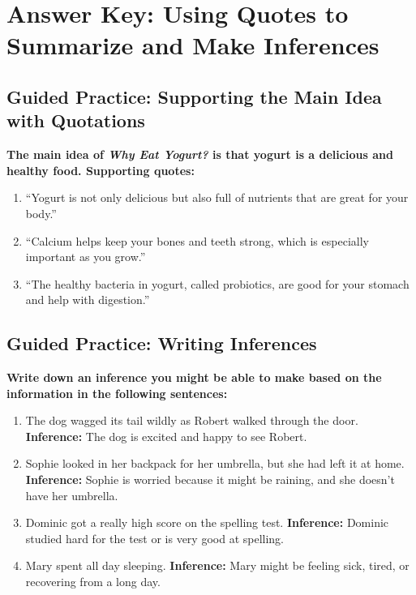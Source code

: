 \documentclass[12pt]{article}
\begin{document}
\section*{Answer Key: Using Quotes to Summarize and Make Inferences}

\subsection*{Guided Practice: Supporting the Main Idea with Quotations}
\textbf{The main idea of \textit{Why Eat Yogurt?} is that yogurt is a delicious and healthy food. Supporting quotes:}
\begin{enumerate}
    \item “Yogurt is not only delicious but also full of nutrients that are great for your body.”
    \item “Calcium helps keep your bones and teeth strong, which is especially important as you grow.”
    \item “The healthy bacteria in yogurt, called probiotics, are good for your stomach and help with digestion.”
\end{enumerate}

\subsection*{Guided Practice: Writing Inferences}
\textbf{Write down an inference you might be able to make based on the information in the following sentences:}
\begin{enumerate}
    \item The dog wagged its tail wildly as Robert walked through the door.  
    \textbf{Inference:} The dog is excited and happy to see Robert.
    \item Sophie looked in her backpack for her umbrella, but she had left it at home.  
    \textbf{Inference:} Sophie is worried because it might be raining, and she doesn’t have her umbrella.
    \item Dominic got a really high score on the spelling test.  
    \textbf{Inference:} Dominic studied hard for the test or is very good at spelling.
    \item Mary spent all day sleeping.  
    \textbf{Inference:} Mary might be feeling sick, tired, or recovering from a long day.
\end{enumerate}
\end{document}
